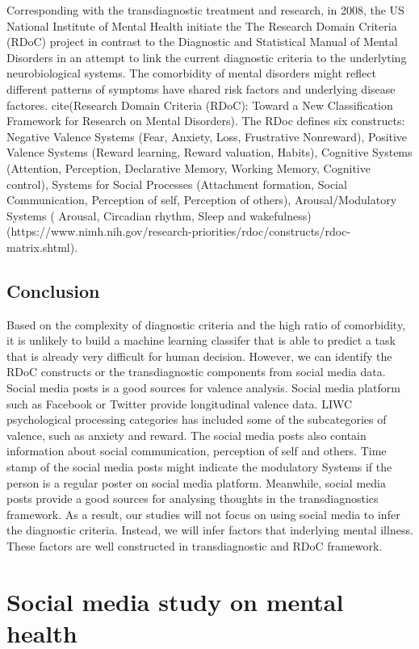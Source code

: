 Corresponding with the transdiagnostic treatment and research, in 2008, the US National Institute of Mental Health initiate the The Research Domain Criteria (RDoC) project in contrast to the  Diagnostic and Statistical Manual of Mental Disorders in an attempt to link the current diagnostic criteria to the underlyting neurobiological systems. The comorbidity of mental disorders might reflect different patterns of symptoms have shared risk factors and underlying disease factores. cite(Research Domain Criteria (RDoC): Toward a New Classification Framework for Research on Mental Disorders). The RDoc defines six constructs: Negative Valence Systems (Fear, Anxiety, Loss, Frustrative Nonreward), Positive Valence Systems (Reward learning, Reward valuation, Habits), Cognitive Systems (Attention, Perception, Declarative Memory, Working Memory, Cognitive control), Systems for Social Processes (Attachment formation, Social Communication, Perception of self, Perception of others), Arousal/Modulatory Systems (
Arousal, Circadian rhythm, Sleep and wakefulness) (https://www.nimh.nih.gov/research-priorities/rdoc/constructs/rdoc-matrix.shtml). 


\subsection{Conclusion}
Based on the complexity of diagnostic criteria and the high ratio of comorbidity, it is unlikely to build a machine learning classifer that is able to predict a task that is already very difficult for human decision. However, we can identify the RDoC constructs or the transdiagnostic components from social media data. Social media posts is a good sources for valence analysis. Social media platform such as Facebook or Twitter provide longitudinal valence data. LIWC psychological processing categories has included some of the subcategories of valence, such as anxiety and reward. The social media posts also contain information about social communication, perception of self and others. Time stamp of the social media posts might indicate the modulatory Systems if the person is a regular poster on social media platform. Meanwhile, social media posts provide a good sources for analysing thoughts in the transdiagnostics framework. As a result, our studies will not focus on using social media to infer the diagnostic criteria. Instead, we will infer factors that inderlying mental illness. These factors are well constructed in transdiagnostic and RDoC framework.


\section{Social media study on mental health}

